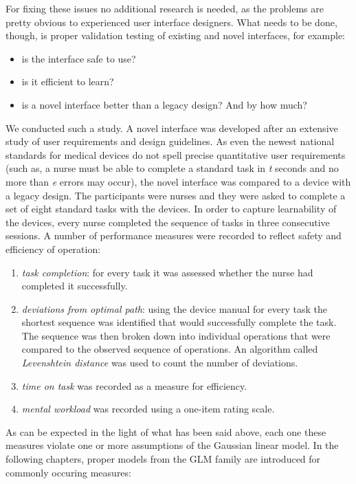 \documentclass[]{svmono}
\providecommand{\tightlist}{%
  \setlength{\itemsep}{0pt}\setlength{\parskip}{0pt}}
\begin{document}
For fixing these issues no additional research is needed, as the
problems are pretty obvious to experienced user interface designers.
What needs to be done, though, is proper validation testing of existing
and novel interfaces, for example:

\begin{itemize}
\tightlist
\item
  is the interface safe to use?
\item
  is it efficient to learn?
\item
  is a novel interface better than a legacy design? And by how much?
\end{itemize}

We conducted such a study. A novel interface was developed after an
extensive study of user requirements and design guidelines. As even the
newest national standards for medical devices do not spell precise
quantitative user requirements (such as, a nurse must be able to
complete a standard task in \emph{t} seconds and no more than \emph{e}
errors may occur), the novel interface was compared to a device with a
legacy design. The participants were nurses and they were asked to
complete a set of eight standard tasks with the devices. In order to
capture learnability of the devices, every nurse completed the sequence
of tasks in three consecutive sessions. A number of performance measures
were recorded to reflect safety and efficiency of operation:

\begin{enumerate}
\def\labelenumi{\arabic{enumi}.}
\tightlist
\item
  \emph{task completion}: for every task it was assessed whether the
  nurse had completed it successfully.
\item
  \emph{deviations from optimal path}: using the device manual for every
  task the shortest sequence was identified that would successfully
  complete the task. The sequence was then broken down into individual
  operations that were compared to the observed sequence of operations.
  An algorithm called \emph{Levenshtein distance} was used to count the
  number of deviations.
\item
  \emph{time on task} was recorded as a measure for efficiency.
\item
  \emph{mental workload} was recorded using a one-item rating scale.
\end{enumerate}

As can be expected in the light of what has been said above, each one
these measures violate one or more assumptions of the Gaussian linear
model. In the following chapters, proper models from the GLM family are
introduced for commonly occuring measures:
\end{document}
